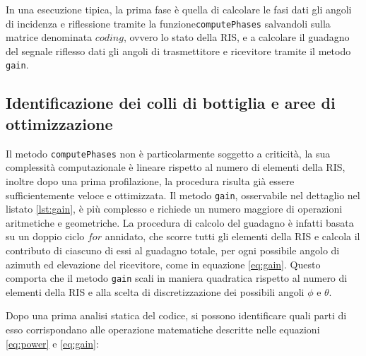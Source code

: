 In una esecuzione tipica, la prima fase è quella di calcolare le fasi dati gli angoli
di incidenza e riflessione tramite la funzione\texttt{computePhases} salvandoli sulla
matrice denominata $coding$, ovvero lo stato della RIS, e a calcolare il guadagno
del segnale riflesso dati gli angoli di trasmettitore e ricevitore tramite il metodo
\texttt{gain}.

\subsection{Identificazione dei colli di bottiglia e aree di ottimizzazione}
\label{sec:ottimizzazione}

Il metodo \texttt{computePhases} non è particolarmente soggetto a criticità, la sua
complessità computazionale è lineare rispetto al numero di elementi della RIS,
inoltre dopo una prima profilazione, la procedura risulta già essere sufficientemente
veloce e ottimizzata. Il metodo \texttt{gain}, osservabile nel dettaglio nel
listato \ref{lst:gain}, è più complesso e richiede un numero maggiore di operazioni
aritmetiche e geometriche. La procedura di calcolo del guadagno è infatti basata
su un doppio ciclo $for$ annidato, che scorre tutti gli elementi della RIS e calcola
il contributo di ciascuno di essi al guadagno totale, per ogni possibile angolo
di azimuth ed elevazione del ricevitore, come in equazione \ref{eq:gain}. Questo
comporta che il metodo \texttt{gain} scali in maniera quadratica rispetto al numero
di elementi della RIS e alla scelta di discretizzazione dei possibili angoli $\phi$
e $\theta$.



Dopo una prima analisi statica del codice, si possono identificare quali parti di
esso corrispondano alle operazione matematiche descritte nelle equazioni \ref{eq:power}
e \ref{eq:gain}:

